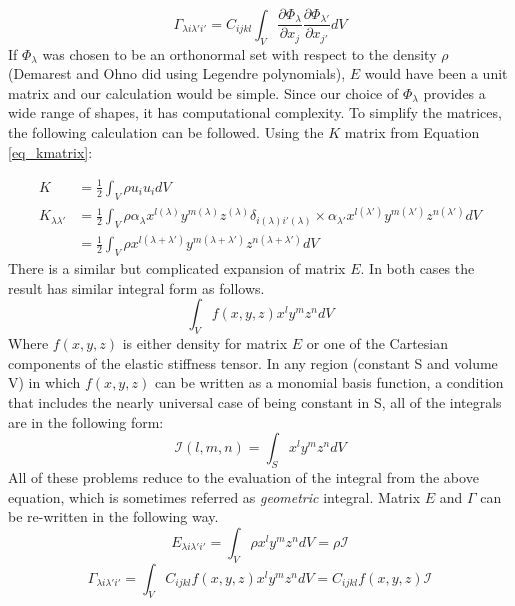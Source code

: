 \begin{doublespacing}
\begin{equation}
\label{eq_gammamatrix}
\Gamma_{\lambda i \lambda' i'} = C_{ijkl} \int_V \frac{\partial{\Phi_{\lambda}}}{\partial{x_j}} \frac{\partial{\Phi_{\lambda'}}}{\partial{x_{j'}}} dV
\end{equation}
If $\Phi_\lambda$ was chosen to be an orthonormal set with respect to the density $\rho$ (Demarest and Ohno did using Legendre polynomials), $E$ would have been a unit matrix and our calculation would be simple. Since our choice of $\Phi_\lambda$  provides a wide range of shapes, it has computational complexity. To simplify the matrices, the following calculation can be followed. Using the $K$ matrix from Equation
\ref{eq_kmatrix}:

\begin{equation}
\begin{array}{cl}
 K &= \frac{1}{2} \int_V \rho u_i u_i dV \\
 K _{\lambda \lambda'} &= \frac{1}{2} \int_V \rho \alpha_\lambda x^{l(\lambda)} y^{m(\lambda)} z^{(\lambda)} \delta_{i(\lambda)i'(\lambda)} \times \alpha_{\lambda'} x^{l(\lambda')} y^{m(\lambda')} z^{n(\lambda')} dV \\
  &= \frac{1}{2} \int_V \rho x^{l(\lambda + \lambda')} y^{m(\lambda + \lambda')} z^{n(\lambda + \lambda')} dV 
\end{array}
\end{equation}
There is a similar but complicated expansion of matrix $E$. In both cases the result has similar integral form as follows.
\begin{equation}
\int_V f(x,y,z) x^l y^m z^n dV
\end{equation}
Where $f(x,y,z)$ is either density for matrix $E$ or one of the Cartesian components of the elastic stiffness tensor. In any region (constant S and volume V) in which $f(x,y,z)$ can be written as a monomial basis function, a condition that includes the nearly universal case of being constant in S, all of the integrals are in the following form:
\begin{equation}
\label{eq_integral}
\mathcal{I}(l,m,n) = \int_S x^l y^m z^n dV 
\end{equation}
All of these problems reduce to the evaluation of the integral from the above equation, which is sometimes referred as \textit{geometric} integral. Matrix $E$ and $\Gamma$ can be re-written in the following way.
\begin{equation}
E_{\lambda i \lambda' i'} = \int_V \rho x^l y^m z^n dV = \rho \mathcal{I}
\end{equation}
\begin{equation}
\Gamma_{\lambda i \lambda' i'}=\int_V C_{ijkl} f(x,y,z)x^l y^m z^n dV = C_{ijkl}f(x,y,z)\mathcal{I}
\end{equation}



\end{doublespacing}
